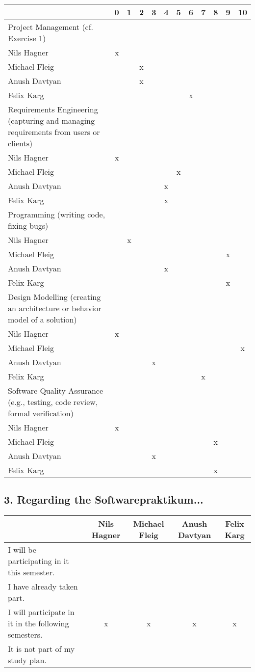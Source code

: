 \documentclass{scrartcl}
\begin{document}
\begin{tabular}{| p{10cm} | c | c | c | c | c | c | c | c | c | c | c |}
	\hline
	& 0& 1& 2& 3& 4& 5& 6& 7& 8& 9& 10\\
	\hline
	Project Management (cf. Exercise 1) \\
	\hline
	Nils Hagner &x&&&&&&&&&&\\ \hline
	Michael Fleig &&&x&&&&&&&&\\ \hline
	Anush Davtyan &&&x&&&&&&&&\\ \hline
	Felix Karg &&&&&&&x&&&&\\ \hline
	Requirements Engineering (capturing and managing requirements from users or clients)\\
	\hline
	Nils Hagner &x&&&&&&&&&&\\ \hline
	Michael Fleig &&&&&&x&&&&&\\ \hline
	Anush Davtyan &&&&&x&&&&&&\\ \hline
	Felix Karg &&&&&x&&&&&&\\ \hline
	Programming (writing code, fixing bugs)\\
	\hline
	Nils Hagner &&x&&&&&&&&&\\ \hline
	Michael Fleig &&&&&&&&&&x&\\ \hline
	Anush Davtyan &&&&&x&&&&&&\\ \hline
	Felix Karg &&&&&&&&&&x&\\ \hline
	Design Modelling (creating an architecture or behavior model of a solution)\\
	\hline
	Nils Hagner &x&&&&&&&&&&\\ \hline
	Michael Fleig &&&&&&&&&&&x\\ \hline
	Anush Davtyan &&&&x&&&&&&&\\ \hline
	Felix Karg &&&&&&&&x&&&\\ \hline
	Software Quality Assurance (e.g., testing, code review, formal verification)\\
	\hline
	Nils Hagner &x&&&&&&&&&&\\ \hline
	Michael Fleig &&&&&&&&&x&&\\ \hline
	Anush Davtyan &&&&x&&&&&&&\\ \hline
	Felix Karg &&&&&&&&&x&&\\ \hline
\end{tabular}


\subsection*{3. Regarding the Softwarepraktikum...}
\begin{tabular} {| p{7cm} | c | c | c | c |}
	\hline
	&Nils Hagner&Michael Fleig&Anush Davtyan&Felix Karg\\
	\hline
	I will be participating in it this semester. &&&&\\
	\hline
	I have already taken part. &&&&\\
	\hline
	I will participate in it in the following semesters. &x&x&x&x\\
	\hline
	It is not part of my study plan. &&&&\\
	\hline
\end{tabular}
\end{document}

